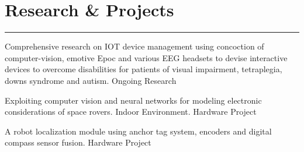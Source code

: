 \documentclass[]{ShumailaAhmed-Resume}
\begin{document}
\begin{minipage}[t]{0.66\textwidth}
\section{Research \& Projects}
\noindent\rule{12.5cm}{0.4pt}
 
\descript{}
\noindent
\hspace{5em}%
\begin{minipage}{0.85\textwidth\vspace{5pt}}
Comprehensive research on IOT device management using concoction of computer-vision, emotive
Epoc and various EEG headsets to devise interactive devices to overcome disabilities
for patients of visual impairment, tetraplegia, downs syndrome and autism. Ongoing
Research
\end{minipage}
 
\descript{}
\noindent
\hspace{5em}%
\begin{minipage}{0.85\textwidth\vspace{5pt}}
Exploiting computer vision and neural networks for modeling electronic considerations
of space rovers.
Indoor Environment. Hardware Project
\end{minipage}
 
\descript{}
\noindent
\hspace{5em}%
\begin{minipage}{0.85\textwidth\vspace{5pt}}
A robot localization module using anchor tag system, encoders and digital compass
sensor fusion. Hardware Project
\end{minipage}
\end{minipage} 
\end{document}
